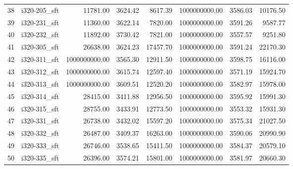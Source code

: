 \begin{tabular}{llrrrrrr}
38 &  i320-205\_sft &              11781.00 &                   3624.42 &             8617.39 &      1000000000.00 &                3586.03 &         10176.50 \\
39 &  i320-231\_sft &              11360.00 &                   3622.14 &             7820.00 &      1000000000.00 &                3591.26 &          9587.77 \\
40 &  i320-232\_sft &              11892.00 &                   3730.42 &             7821.00 &      1000000000.00 &                3557.57 &          9251.80 \\
41 &  i320-305\_sft &              26638.00 &                   3624.23 &            17457.70 &      1000000000.00 &                3591.24 &         22170.30 \\
42 &  i320-311\_sft &         1000000000.00 &                   3565.30 &            12911.50 &      1000000000.00 &                3598.75 &         16116.00 \\
43 &  i320-312\_sft &         1000000000.00 &                   3615.74 &            12597.40 &      1000000000.00 &                3571.19 &         15924.70 \\
44 &  i320-313\_sft &         1000000000.00 &                   3609.51 &            12520.20 &      1000000000.00 &                3582.97 &         15978.00 \\
45 &  i320-314\_sft &              28415.00 &                   3411.88 &            12956.50 &      1000000000.00 &                3595.92 &         15991.30 \\
46 &  i320-315\_sft &              28755.00 &                   3433.91 &            12773.50 &      1000000000.00 &                3553.32 &         15931.30 \\
47 &  i320-331\_sft &              26738.00 &                   3432.02 &            15597.20 &      1000000000.00 &                3575.34 &         21027.50 \\
48 &  i320-332\_sft &              26487.00 &                   3409.37 &            16263.00 &      1000000000.00 &                3590.06 &         20990.90 \\
49 &  i320-333\_sft &              26746.00 &                   3538.65 &            15411.50 &      1000000000.00 &                3584.37 &         20579.10 \\
50 &  i320-335\_sft &              26396.00 &                   3574.21 &            15801.00 &      1000000000.00 &                3581.97 &         20660.30 \\

\end{tabular}
